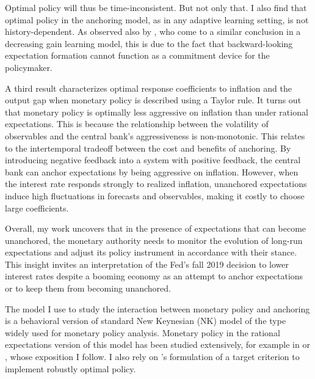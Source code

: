 \documentclass[11pt]{article}
\renewcommand{\[}{\begin{equation}}
\renewcommand{\]}{\end{equation}}
\begin{document}
Optimal policy will thus be time-inconsistent. But not only that. I also find that optimal policy in the anchoring model, as in any adaptive learning setting, is not history-dependent. As observed also by \cite{mele2019perils}, who come to a similar conclusion in a decreasing gain learning model, this is due to the fact that backward-looking expectation formation cannot function as a commitment device for the policymaker. 

A third result characterizes optimal response coefficients to inflation and the output gap when monetary policy is described using a Taylor rule. It turns out that monetary policy is optimally less aggressive on inflation than under rational expectations. This is because the relationship between the volatility of observables and the central bank's aggressiveness is non-monotonic. This relates to the intertemporal tradeoff between the cost and benefits of anchoring. By introducing negative feedback into a system with positive feedback, the central bank can anchor expectations by being aggressive on inflation. However, when the interest rate responds strongly to realized inflation, unanchored expectations induce high fluctuations in forecasts and observables, making it costly to choose large coefficients. 

Overall, my work uncovers that in the presence of expectations that can become unanchored, the monetary authority needs to monitor the evolution of long-run expectations and adjust its policy instrument in accordance with their stance. This insight invites an interpretation of the Fed's fall 2019 decision to lower interest rates despite a booming economy as an attempt to anchor expectations or to keep them from becoming unanchored. 

The model I use to study the interaction between monetary policy and anchoring is a behavioral version of standard New Keynesian (NK) model of the type widely used for monetary policy analysis. Monetary policy in the rational expectations version of this model has been studied extensively, for example in \cite{clarida1999science} or \cite{woodford2011interest}, whose exposition I follow. I also rely on \cite{woodford2011interest}'s formulation of a target criterion to implement robustly optimal policy.
\end{document}
